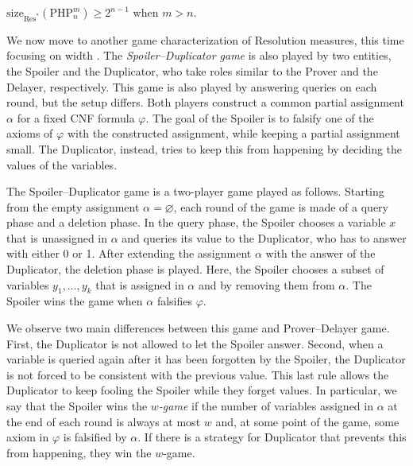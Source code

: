 \begin{corollary}
    $\mathrm{size}_{\mathrm{Res}^*}(\mathrm{PHP}^{m}_n) \geq 2^{n-1}$ when $m > n$.
\end{corollary}

We now move to another game characterization of Resolution measures, this time focusing on width \cite{atserias_dalmau}. The \textit{Spoiler--Duplicator game} is also played by two entities, the Spoiler and the Duplicator, who take roles similar to the Prover and the Delayer, respectively. This game is also played by answering queries on each round, but the setup differs. Both players construct a common partial assignment $\alpha$ for a fixed CNF formula $\varphi$. The goal of the Spoiler is to falsify one of the axioms of $\varphi$ with the constructed assignment, while keeping a partial assignment small. The Duplicator, instead, tries to keep this from happening by deciding the values of the variables.

\begin{definition}
    The Spoiler--Duplicator game is a two-player game played as follows. Starting from the empty assignment $\alpha = \varnothing$, each round of the game is made of a query phase and a deletion phase. In the query phase, the Spoiler chooses a variable $x$ that is unassigned in $\alpha$ and queries its value to the Duplicator, who has to answer with either 0 or 1. After extending the assignment $\alpha$ with the answer of the Duplicator, the deletion phase is played. Here, the Spoiler chooses a subset of variables $y_1, \ldots, y_k$ that is assigned in $\alpha$ and  by removing them from $\alpha$. The Spoiler wins the game when $\alpha$ falsifies $\varphi$.
\end{definition}


We observe two main differences between this game and Prover--Delayer game. First, the Duplicator is not allowed to let the Spoiler answer. Second, when a variable is queried again after it has been forgotten by the Spoiler, the Duplicator is not forced to be consistent with the previous value. This last rule allows the Duplicator to keep fooling the Spoiler while they forget values. In particular, we say that the Spoiler wins the \textit{$w$-game} if the number of variables assigned in $\alpha$ at the end of each round is always at most $w$ and, at some point of the game, some axiom in $\varphi$ is falsified by $\alpha$. If there is a strategy for Duplicator that prevents this from happening, they win the $w$-game.

